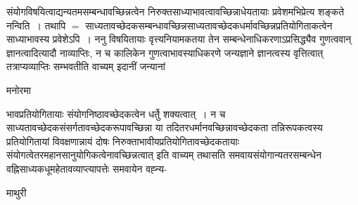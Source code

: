 \documentclass[10pt, openany]{book}
\begin{document}
{संयोगविषयित्वाद्यन्यतमसम्बन्धावच्छिन्नत्वेन निरुक्तसाध्याभावत्वावच्छिन्नाधेयतायाः प्रवेशमभिप्रेत्य शङ्कते {\la नन्विति~।} तथापि $=$ साध्यतावच्छेदकसम्बन्धावच्छिन्नसाध्यतावच्छेदकधर्मावच्छिन्नप्रतियोगिताकत्वेन साध्याभावस्य प्रवेशेऽपि~। ननु विषयितायाः वृत्त्यनियामकतया तेन सम्बन्धेनाधिकरणाऽप्रसिद्ध्यैव गुणत्ववान् ज्ञानत्वादित्यादौ नाव्याप्तिः, न च कालिकेन गुणत्वाभावस्याधिकरणे जन्यज्ञाने ज्ञानत्वस्य वृत्तित्वात् तत्राप्यव्याप्तिः सम्भवतीति वाच्यम्
इदानीं जन्यानां
\begin{center}   मनोरमा  \end{center}
भावप्रतियोगितायाः संयोगनिष्ठावच्छेदकत्वेन धर्तेु  शक्यत्वात्~। न च साध्यतावच्छेदकसंसर्गतावच्छेदकरूपावच्छिन्ना या तदितरधर्मानवच्छिन्नावच्छेदकता तन्निरूपकत्वस्य
प्रतियोगितायां विवक्षणान्नायं दोषः निरुक्ताभावीयप्रतियोगितावच्छेदकतायाः संयोगत्वेतरमहानसानुयोगिकत्वेनावच्छिन्नत्वात् इति वाच्यम् तथासति समवायसंयोगान्यतरसम्बन्धेन वह्निसाध्यकधूमहेतावव्याप्त्यापत्तेः समवायेन वह्न्य-
\newpage
\begin{center}  माथुरी  \end{center}

}
\end{document}
